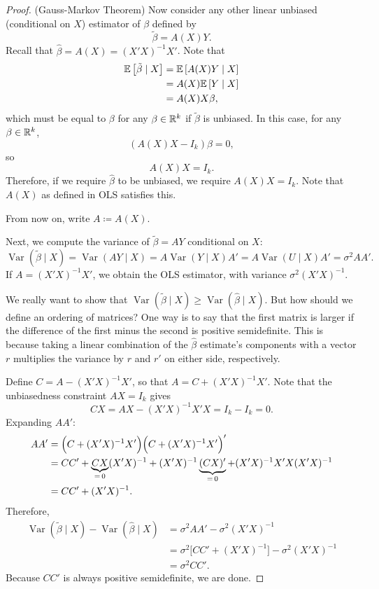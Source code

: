 \begin{proof}(Gauss-Markov Theorem)
	Now consider any other linear unbiased (conditional on $X$) estimator of $\beta$ defined by \[
		\tilde{\beta} = A(X) Y
	.\] Recall that $\hat{\beta} = A(X) = \left( X'X \right)^{-1}X'$. Note that 
	\begin{align*}
		\mathbb{E}\left[\tilde{\beta} \mid X\right]  &= \mathbb{E}\left[A(X) Y \mid X\right]  \\
		&= A(X) \mathbb{E}\left[Y \mid X\right]  \\
		&= A(X) X \beta
	,\end{align*}
	which must be equal to $\beta$ for any $\beta \in \mathbb{R}^k$ if $\tilde{\beta}$ is unbiased. In this case, for any $\beta \in \mathbb{R}^k$, \[
		\left( A(X) X - I_k \right)\beta = 0
	,\] so \[
		A(X)X = I_k
	.\] 
	Therefore, if we require $\hat{\beta}$ to be unbiased, we require $A(X) X = I_k$. Note that $A(X)$ as defined in OLS satisfies this.

	From now on, write $A \coloneqq A\left( X \right)$.

	Next, we compute the variance of $\tilde{\beta} = AY$ conditional on $X$:
	\[
		\operatorname{Var}\left(\tilde{\beta} \mid X\right) = \operatorname{Var}(AY\mid X)=A\operatorname{Var}(Y\mid X)A'=A\operatorname{Var}(U\mid X)A'=\sigma^2AA'.
	\]
	If $A=(X'X)^{-1}X'$, we obtain the OLS estimator, with variance $\sigma^2(X'X)^{-1}$.

	We really want to show that $\operatorname{Var}\left(\tilde{\beta}\mid X\right) \ge \operatorname{Var}\left(\hat{\beta} \mid X\right)$. But how should we define an ordering of matrices? One way is to say that the first matrix is larger if the difference of the first minus the second is positive semidefinite. This is because taking a linear combination of the $\hat{\beta}$ estimate's components with a vector $r$ multiplies the variance by $r$ and $r'$ on either side, respectively.

	Define $C = A - (X'X)^{-1}X'$, so that $A = C + (X'X)^{-1}X'$. Note that the unbiasedness constraint $AX = I_k$ gives
	\[
		CX = AX - (X'X)^{-1}X'X = I_k - I_k = 0.
	\]
	Expanding $AA'$:
	\begin{align*}
		AA' &= \Bigl(C + (X'X)^{-1}X'\Bigr)\Bigl(C + (X'X)^{-1}X'\Bigr)' \\
		    &= CC' + \underbrace{CX}_{=\,0}(X'X)^{-1} + (X'X)^{-1}\underbrace{(CX)'}_{=\,0} + (X'X)^{-1}X'X(X'X)^{-1} \\
		    &= CC' + (X'X)^{-1}.
	\end{align*}
	Therefore,
	\begin{align*}
		\operatorname{Var}\left(\tilde{\beta} \mid X\right) - \operatorname{Var}\left(\hat{\beta} \mid X\right)
			&= \sigma^2 AA' - \sigma^2(X'X)^{-1} \\
			&= \sigma^2\bigl[CC' + (X'X)^{-1}\bigr] - \sigma^2(X'X)^{-1} \\
			&= \sigma^2 CC'.
	\end{align*}
	Because $CC'$ is always positive semidefinite, we are done.

\end{proof}

